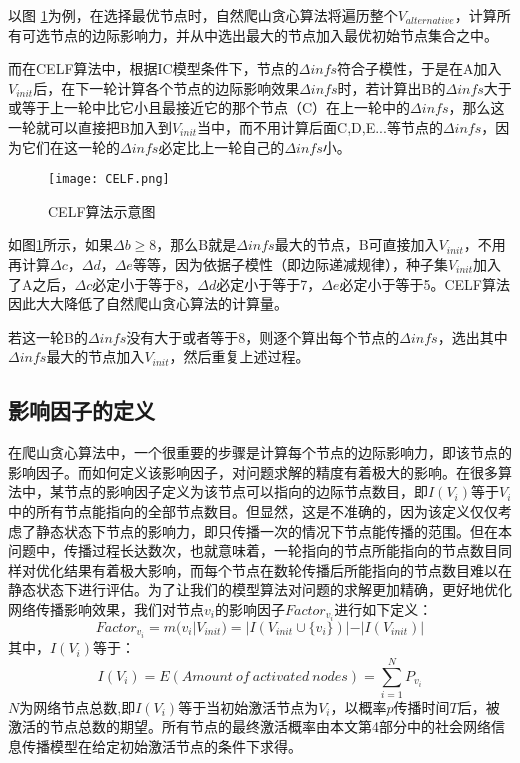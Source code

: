 \documentclass[UTF8]{ctexart}
\begin{document}
以图 \ref{CELF}为例，在选择最优节点时，自然爬山贪心算法将遍历整个$V_{alternative}$，计算所有可选节点的边际影响力，并从中选出最大的节点加入最优初始节点集合之中。

而在CELF算法中，根据IC模型条件下，节点的$\Delta infs$符合子模性，于是在A加入$V_{init}$后，在下一轮计算各个节点的边际影响效果$\Delta infs$时，若计算出B的$\Delta infs$大于或等于上一轮中比它小且最接近它的那个节点（C）在上一轮中的$\Delta infs$，那么这一轮就可以直接把B加入到$V_{init}$当中，而不用计算后面C,D,E...等节点的$\Delta infs$，因为它们在这一轮的$\Delta infs$必定比上一轮自己的$\Delta infs$小。

\begin{figure}[h!]
	\centering
	\texttt{[image: CELF.png]}
	\caption{CELF算法示意图}
	\label{CELF}
\end{figure}

如图\ref{CELF}所示，如果$\Delta b \geqslant 8$，那么B就是$\Delta infs$最大的节点，B可直接加入$V_{init}$，不用再计算$\Delta c$，$\Delta d$，$\Delta e$等等，因为依据子模性（即边际递减规律），种子集$V_{init}$加入了A之后，$\Delta c$必定小于等于8，$\Delta d$必定小于等于7，$\Delta e$必定小于等于5。CELF算法因此大大降低了自然爬山贪心算法的计算量。

若这一轮B的$\Delta infs$没有大于或者等于8，则逐个算出每个节点的$\Delta infs$，选出其中$\Delta infs$最大的节点加入$V_{init}$，然后重复上述过程。

\subsection{影响因子的定义}
在爬山贪心算法中，一个很重要的步骤是计算每个节点的边际影响力，即该节点的影响因子。而如何定义该影响因子，对问题求解的精度有着极大的影响。在很多算法中，某节点的影响因子定义为该节点可以指向的边际节点数目，即$I(V_{i})$等于$V_{i}$中的所有节点能指向的全部节点数目。但显然，这是不准确的，因为该定义仅仅考虑了静态状态下节点的影响力，即只传播一次的情况下节点能传播的范围。但在本问题中，传播过程长达数次，也就意味着，一轮指向的节点所能指向的节点数目同样对优化结果有着极大影响，而每个节点在数轮传播后所能指向的节点数目难以在静态状态下进行评估。为了让我们的模型算法对问题的求解更加精确，更好地优化网络传播影响效果，我们对节点$v_i$的影响因子$Factor_{v_i}$进行如下定义：
\begin{displaymath}
Factor_{v_i} = m(v_i|V_{init})=|I(V_{init}\cup \{v_i\})|-|I(V_{init})|
\end{displaymath}
其中，$I(V_{i})$等于：
\begin{displaymath}
I(V_{i}) = E(Amount\ of\ activated\ nodes)=\sum_{i=1}^N{P_{v_i}}
\end{displaymath}
$N$为网络节点总数,即$I(V_{i})$等于当初始激活节点为$V_i$，以概率$p$传播时间$T$后，被激活的节点总数的期望。所有节点的最终激活概率由本文第4部分中的社会网络信息传播模型在给定初始激活节点的条件下求得。
\end{document}
